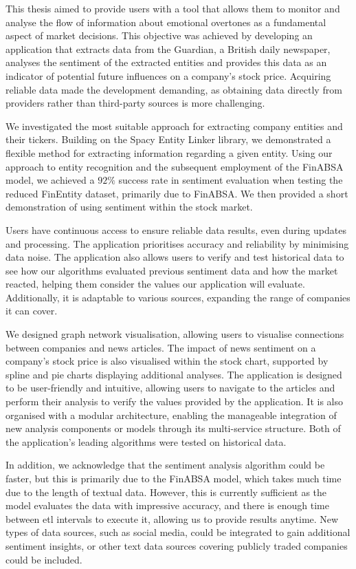 
This thesis aimed to provide users with a tool that allows them to monitor and analyse the flow of information about emotional overtones as a fundamental aspect of market decisions. This objective was achieved by developing an application that extracts data from the Guardian, a British daily newspaper, analyses the sentiment of the extracted entities and provides this data as an indicator of potential future influences on a company's stock price. Acquiring reliable data made the development demanding, as obtaining data directly from providers rather than third-party sources is more challenging.

We investigated the most suitable approach for extracting company entities and their tickers. Building on the Spacy Entity Linker library, we demonstrated a flexible method for extracting information regarding a given entity. Using our approach to entity recognition and the subsequent employment of the FinABSA model, we achieved a $92\%$ success rate in sentiment evaluation when testing the reduced FinEntity dataset, primarily due to FinABSA. We then provided a short demonstration of using sentiment within the stock market.

Users have continuous access to ensure reliable data results, even during updates and processing. The application prioritises accuracy and reliability by minimising data noise. The application also allows users to verify and test historical data to see how our algorithms evaluated previous sentiment data and how the market reacted, helping them consider the values our application will evaluate. Additionally, it is adaptable to various sources, expanding the range of companies it can cover.

We designed graph network visualisation, allowing users to visualise connections between companies and news articles. The impact of news sentiment on a company's stock price is also visualised within the stock chart, supported by spline and pie charts displaying additional analyses. The application is designed to be user-friendly and intuitive, allowing users to navigate to the articles and perform their analysis to verify the values provided by the application. It is also organised with a modular architecture, enabling the manageable integration of new analysis components or models through its multi-service structure. Both of the application's leading algorithms were tested on historical data. 

In addition, we acknowledge that the sentiment analysis algorithm could be faster, but this is primarily due to the FinABSA model, which takes much time due to the length of textual data. However, this is currently sufficient as the model evaluates the data with impressive accuracy, and there is enough time between \acrshort{etl} intervals to execute it, allowing us to provide results anytime. New types of data sources, such as social media, could be integrated to gain additional sentiment insights, or other text data sources covering publicly traded companies could be included.


